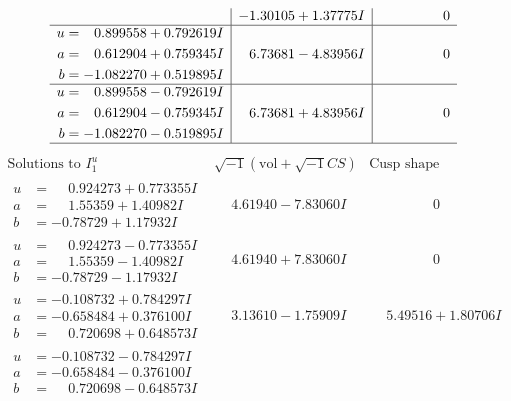 \documentclass[1p]{elsarticle_modified}
\theoremstyle{definition}
\newcommand{\I}{\sqrt{-1}}
\begin{document}
$$\begin{array}{c|c|c}
 & -1.30105 + 1.37775 I & \phantom{-0.000000 } 0 \\ \hline\begin{aligned}
u &= \phantom{-}0.899558 + 0.792619 I \\
a &= \phantom{-}0.612904 + 0.759345 I \\
b &= -1.082270 + 0.519895 I\end{aligned}
 & \phantom{-}6.73681 - 4.83956 I & \phantom{-0.000000 } 0 \\ \hline\begin{aligned}
u &= \phantom{-}0.899558 - 0.792619 I \\
a &= \phantom{-}0.612904 - 0.759345 I \\
b &= -1.082270 - 0.519895 I\end{aligned}
 & \phantom{-}6.73681 + 4.83956 I & \phantom{-0.000000 } 0\\
 \hline 
 \end{array}$$\newpage$$\begin{array}{c|c|c}  
\text{Solutions to }I^u_{1}& \I (\text{vol} + \sqrt{-1}CS) & \text{Cusp shape}\\
 \hline 
\begin{aligned}
u &= \phantom{-}0.924273 + 0.773355 I \\
a &= \phantom{-}1.55359 + 1.40982 I \\
b &= -0.78729 + 1.17932 I\end{aligned}
 & \phantom{-}4.61940 - 7.83060 I & \phantom{-0.000000 } 0 \\ \hline\begin{aligned}
u &= \phantom{-}0.924273 - 0.773355 I \\
a &= \phantom{-}1.55359 - 1.40982 I \\
b &= -0.78729 - 1.17932 I\end{aligned}
 & \phantom{-}4.61940 + 7.83060 I & \phantom{-0.000000 } 0 \\ \hline\begin{aligned}
u &= -0.108732 + 0.784297 I \\
a &= -0.658484 + 0.376100 I \\
b &= \phantom{-}0.720698 + 0.648573 I\end{aligned}
 & \phantom{-}3.13610 - 1.75909 I & \phantom{-}5.49516 + 1.80706 I \\ \hline\begin{aligned}
u &= -0.108732 - 0.784297 I \\
a &= -0.658484 - 0.376100 I \\
b &= \phantom{-}0.720698 - 0.648573 I\end{aligned}

\end{array}$$
\end{document}
